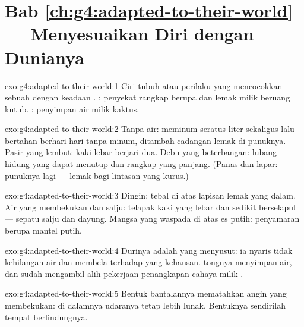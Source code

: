 \section*{Bab \ref{ch:g4:adapted-to-their-world} --- Menyesuaikan Diri dengan Dunianya}

\begin{solution}{exo:g4:adapted-to-their-world:1}
Ciri tubuh atau perilaku yang mencocokkan sebuah  dengan
keadaan . : penyekat rangkap berupa  dan lemak
milik beruang kutub. :  penyimpan air milik kaktus.
\end{solution}

\begin{solution}{exo:g4:adapted-to-their-world:2}
Tanpa air: meminum seratus liter sekaligus lalu bertahan berhari-hari
tanpa minum, ditambah cadangan lemak di punuknya. Pasir yang lembut:
kaki lebar berjari dua. Debu yang beterbangan: lubang hidung yang
dapat menutup dan   rangkap yang panjang. (Panas dan lapar:
punuknya lagi --- lemak bagi lintasan yang kurus.)
\end{solution}

\begin{solution}{exo:g4:adapted-to-their-world:3}
Dingin:  tebal di atas lapisan lemak yang dalam. Air yang
membekukan dan salju: telapak kaki yang lebar dan sedikit berselaput
--- sepatu salju dan dayung. Mangsa yang waspada di atas es putih:
penyamaran berupa mantel putih.
\end{solution}

\begin{solution}{exo:g4:adapted-to-their-world:4}
Durinya adalah  yang menyusut: ia nyaris tidak kehilangan air dan
membela  terhadap  yang kehausan.  tongnya
menyimpan air, dan sudah mengambil alih pekerjaan penangkapan cahaya
milik .
\end{solution}

\begin{solution}{exo:g4:adapted-to-their-world:5}
Bentuk bantalannya mematahkan angin yang membekukan: di dalamnya
udaranya tetap lebih lunak. Bentuknya sendirilah tempat berlindungnya.
\end{solution}

